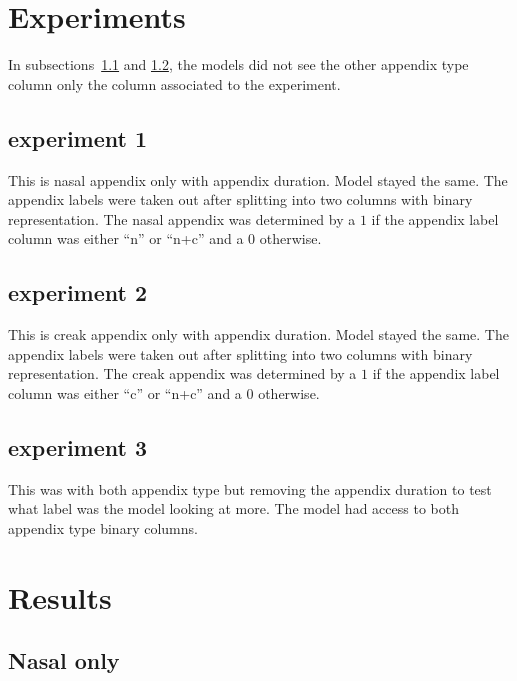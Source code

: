 \documentclass[12pt]{article}
\begin{document}
    \singlespacing
    \setlength{\parindent}{36pt}

    \section{Experiments}
    In subsections~\ref{exp1} and \ref{exp2}, the models did not see the other appendix
    type column only the column associated to the experiment.
    \subsection{experiment 1}
    \label{exp1} This is nasal appendix only with appendix duration. Model stayed
    the same. The appendix labels were taken out after splitting into two
    columns with binary representation. The nasal appendix was determined by a $1$
    if the appendix label column was either ``n'' or ``n+c'' and a $0$ otherwise.
    \subsection{experiment 2}
    \label{exp2} This is creak appendix only with appendix duration. Model stayed
    the same. The appendix labels were taken out after splitting into two
    columns with binary representation. The creak appendix was determined by a $1$
    if the appendix label column was either ``c'' or ``n+c'' and a $0$ otherwise.
    \subsection{experiment 3}
    This was with both appendix type but removing the appendix duration to test
    what label was the model looking at more. The model had access to both appendix
    type binary columns.

    \section{Results}
    \subsection{Nasal only}
\end{document}
